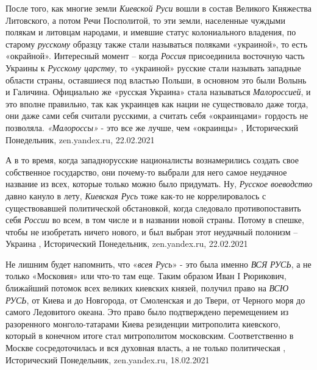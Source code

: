 После того, как многие земли \emph{Киевской Руси} вошли в состав Великого Княжества
Литовского, а потом Речи Посполитой, то эти земли, населенные чуждыми полякам и
литовцам народами, и имевшие статус колониального владения, по старому \emph{русскому}
образцу также стали называться поляками «украиной», то есть «окрайной».
Интересный момент – когда \emph{Россия} присоединила восточную часть Украины к
\emph{Русскому царству}, то «украиной» русские стали называть западные области страны,
оставшиеся под властью Польши, в основном это были Волынь и Галичина.
Официально же «русская Украина» стала называться \emph{Малороссией}, и это вполне
правильно, так как украинцев как нации не существовало даже тогда, они даже
сами себя считали русскими, а считать себя «окраинцами» гордость не позволяла.
\emph{«Малороссы»} - это все же лучше, чем «окраинцы»
, 
Исторический Понедельник, zen.yandex.ru, 22.02.2021 

А в то время, когда западнорусские националисты вознамерились создать свое
собственное государство, они почему-то выбрали для него самое неудачное
название из всех, которые только можно было придумать. Ну, \emph{Русское воеводство}
давно кануло в лету, \emph{Киевская Русь} тоже как-то не коррелировалось с
существовавшей политической обстановкой, когда следовало противопоставить себя
\emph{России} во всем, в том числе и в названии новой страны. Потому в спешке, чтобы
не изобретать ничего нового, и был выбран этот неудачный полонизм – Украина
, 
Исторический Понедельник, zen.yandex.ru, 22.02.2021 

Не лишним будет напомнить, что «\emph{всея Русь}» - это была именно \emph{ВСЯ РУСЬ}, а не
только «Московия» или что-то там еще. Таким образом Иван I Рюрикович, ближайший
потомок всех великих киевских князей, получил право на \emph{ВСЮ РУСЬ}, от Киева и до
Новгорода, от Смоленская и до Твери, от Черного моря до самого Ледовитого
океана. Это право было подтверждено перемещением из разоренного
монголо-татарами Киева резиденции митрополита киевского, который в конечном
итоге стал митрополитом московским. Соответственно в Москве сосредоточилась и
вся духовная власть, а не только политическая
, 
Исторический Понедельник, zen.yandex.ru, 18.02.2021

